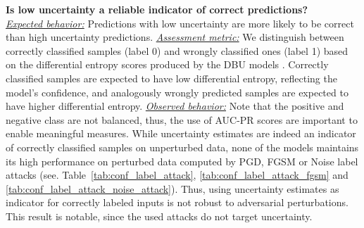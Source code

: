 \textbf{Is low uncertainty a reliable indicator of correct predictions?} \\
%
\underline{\emph{Expected behavior:}}  Predictions with low uncertainty are more likely to be correct than high uncertainty predictions. 
\underline{\emph{Assessment metric:}} We distinguish between correctly classified samples (label 0) and wrongly classified ones (label 1) based on the differential entropy scores produced by the DBU models \citep{malini2018}. Correctly classified samples are expected to have low differential entropy, reflecting the model's confidence, and analogously wrongly predicted samples are expected to have higher differential entropy. 
\underline{\emph{Observed behavior:}} Note that the positive and negative class are not balanced, thus, the use of AUC-PR scores \citep{imbalance_apr} are important to enable meaningful measures. While uncertainty estimates are indeed an indicator of correctly classified samples on unperturbed data, none of the models maintains its high performance on perturbed data computed by PGD, FGSM or Noise label attacks (see. Table~\ref{tab:conf_label_attack}, \ref{tab:conf_label_attack_fgsm} and \ref{tab:conf_label_attack_noise_attack}). Thus, using uncertainty estimates as indicator for correctly labeled inputs is not robust to adversarial perturbations. This result is notable, since the used attacks do not target uncertainty. 





